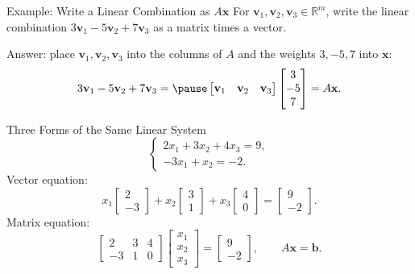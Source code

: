 \begin{frame}{Example: Write a Linear Combination as $A\mathbf{x}$}
  For $\mathbf{v}_1,\mathbf{v}_2,\mathbf{v}_3\in\mathbb{R}^m$, write the linear combination 
  $3\mathbf{v}_1-5\mathbf{v}_2+7\mathbf{v}_3$ as a matrix times a vector.\pause

  \medskip
  Answer: place $\mathbf{v}_1,\mathbf{v}_2,\mathbf{v}_3$ into the columns of $A$
  and the weights $3,-5,7$ into $\mathbf{x}$:\pause
  \[
    3\mathbf{v}_1-5\mathbf{v}_2+7\mathbf{v}_3
    =\pause\begin{bmatrix}\mathbf{v}_1&\mathbf{v}_2&\mathbf{v}_3\end{bmatrix}
      \begin{bmatrix}3\\-5\\7\end{bmatrix}
    =A\mathbf{x}.
  \]
\end{frame}

\begin{frame}{Three Forms of the Same Linear System}
  \[
    \begin{cases}
      2x_1+3x_2+4x_3=9,\\
      -3x_1+x_2=-2.
    \end{cases}
  \]
  Vector equation:
  \[
    x_1\begin{bmatrix}2\\-3\end{bmatrix}
    +x_2\begin{bmatrix}3\\1\end{bmatrix}
    +x_3\begin{bmatrix}4\\0\end{bmatrix}
    =\begin{bmatrix}9\\-2\end{bmatrix}.
  \]
  Matrix equation:
  \[
    \begin{bmatrix}2&3&4\\-3&1&0\end{bmatrix}
    \begin{bmatrix}x_1\\x_2\\x_3\end{bmatrix}
    =\begin{bmatrix}9\\-2\end{bmatrix},
    \qquad A\mathbf{x}=\mathbf{b}.
  \]
\end{frame}


